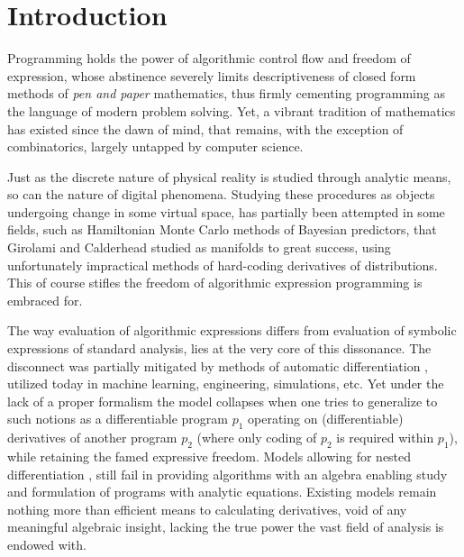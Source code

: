 \documentclass[smallcondensed]{svjour3}
\begin{document}
\section{Introduction}

Programming holds the power of algorithmic control flow and freedom of expression, whose abstinence severely limits descriptiveness of closed form methods of \textit{pen and paper} mathematics, thus firmly cementing programming as the language of modern problem solving. Yet, a vibrant tradition of mathematics has existed since the dawn of mind, that remains, with the exception of combinatorics, largely untapped by computer science. 

Just as the discrete nature of physical reality is studied through analytic means, so can the nature of digital phenomena. Studying these procedures as objects undergoing change in some virtual space, has partially been attempted in some fields, such as Hamiltonian Monte Carlo methods of Bayesian predictors, that Girolami and Calderhead \cite{StatMC} studied as manifolds to great success, using unfortunately impractical methods of hard-coding derivatives of distributions. This of course stifles the freedom of algorithmic expression programming is embraced for.

The way evaluation of algorithmic expressions differs from evaluation of symbolic expressions of standard analysis, lies at the very core of this dissonance. The disconnect was partially mitigated by methods of automatic differentiation \cite{AdSurvey}, utilized today in machine learning, engineering, simulations, etc. Yet under the lack of a proper formalism the model collapses \cite{AD2} when one tries to generalize to such notions as a differentiable program $p_1$ operating on (differentiable) derivatives of another program $p_2$ (where only coding of $p_2$ is required within $p_1$), while retaining the famed expressive freedom. 
Models allowing for nested differentiation \cite{AD1}, still fail in providing algorithms with an algebra enabling study and formulation of programs with analytic equations. Existing models \cite{PcAD} \cite{ReverseAD} remain nothing more than efficient means to calculating derivatives, void of any meaningful algebraic insight, lacking the true power the vast field of analysis is endowed with.
\end{document}
